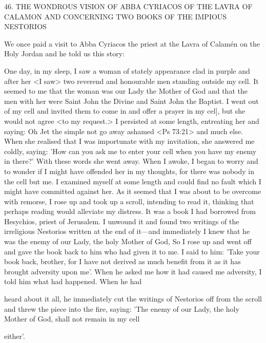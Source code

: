 46. THE WONDROUS VISION OF ABBA CYRIACOS
OF THE LAVRA OF CALAMON AND
CONCERNING TWO BOOKS
OF THE IMPIOUS NESTORIOS

We once paid a visit to Abba Cyriacos the priest at the Lavra of
Calamén on the Holy Jordan and he told us this story:

One day, in my sleep, I saw a woman of stately appearance clad in
purple and after her <I saw> two reverend and honourable men
standing outside my cell. It seemed to me that the woman was our
Lady the Mother of God and that the men with her were Saint John
the Divine and Saint John the Baptist. I went out of my cell and
invited them to come in and offer a prayer in my cel], but she would
not agree <to my request.> I persisted at some length, entreating
her and saying: Oh Jet the simple not go away ashamed <Ps 73:21>
and much else. When she realised that I was importunate with my
invitation, she answered me coldly, saying: 'How can you ask me to
enter your cell when you have my enemy in there?' With these
words she went away. When I awoke, I began to worry and to
wonder if I might have offended her in my thoughts, for there was
nobody in the cell but me. I examined myself at some length and
could find no fault which I might have committed against her. As
it seemed that I was about to be overcome with remorse, I rose up
and took up a scroll, intending to read it, thinking that perhaps
reading would alleviate my distress. It was a book I had borrowed
from Hesychios, priest of Jerusalem. I unwound it and found two
writings of the irreligious Nestorios written at the end of it—and
immediately I knew that he was the enemy of our Lady, the holy
Mother of God, So I rose up and went off and gave the book back
to him who had given it to me. I said to him: 'Take your book
back, brother, for I have not derived as much benefit from it as it
has brought adversity upon me'. When he asked me how it had
caused me adversity, I told him what had happened. When he had

heard about it all, he immediately cut the writings of Nestorios off
from the scroll and threw the piece into the fire, saying: 'The enemy
of our Lady, the holy Mother of God, shall not remain in my cell

either'.

